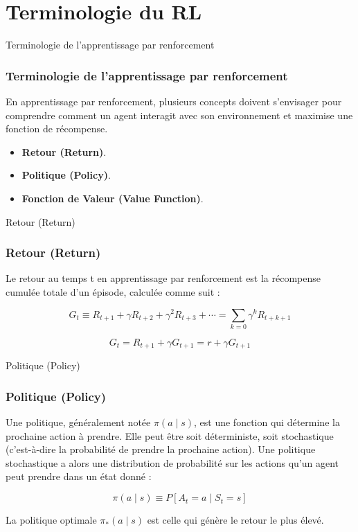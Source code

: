 \documentclass[serif, aspectratio=169]{beamer}
\begin{document}
\section{Terminologie du RL}

\begin{frame}{Terminologie de l'apprentissage par renforcement}
	\frametitle{Terminologie de l'apprentissage par renforcement}
	
	En apprentissage par renforcement, plusieurs concepts doivent s'envisager pour comprendre comment un agent interagit avec son environnement et maximise une fonction de récompense.
	
	\vspace{10pt}
	
	\begin{itemize}
		\item \textbf{Retour (Return)}.
		
		\item \textbf{Politique (Policy)}.
		
		\item \textbf{Fonction de Valeur (Value Function)}.
	\end{itemize}
	
\end{frame}


\begin{frame}{Retour (Return)}
	\frametitle{Retour (Return)}
	
	Le retour au temps t en apprentissage par renforcement est la récompense cumulée totale d'un épisode, calculée comme suit :
	
	\[
	G_t \equiv R_{t+1} + \gamma R_{t+2} + \gamma^2 R_{t+3} + \cdots = \sum_{k=0} \gamma^k R_{t+k+1}
	\]
	
	\vspace{10pt}
	
	\[
	G_t = R_{t+1} + \gamma G_{t+1} = r + \gamma G_{t+1}
	\]
	
\end{frame}

\begin{frame}{Politique (Policy)}
	\frametitle{Politique (Policy)}
	
	Une politique, généralement notée \( \pi(a \mid s) \), est une fonction qui détermine la prochaine action à prendre. Elle peut être soit déterministe, soit stochastique (c'est-à-dire la probabilité de prendre la prochaine action). Une politique stochastique a alors une distribution de probabilité sur les actions qu'un agent peut prendre dans un état donné :
	
	\[
	\pi(a \mid s) \equiv P[A_t = a \mid S_t = s]
	\]
	
	\vspace{10pt}
	
	La politique optimale \( \pi_*(a \mid s) \) est celle qui génère le retour le plus élevé.
	
\end{frame}
\end{document}
